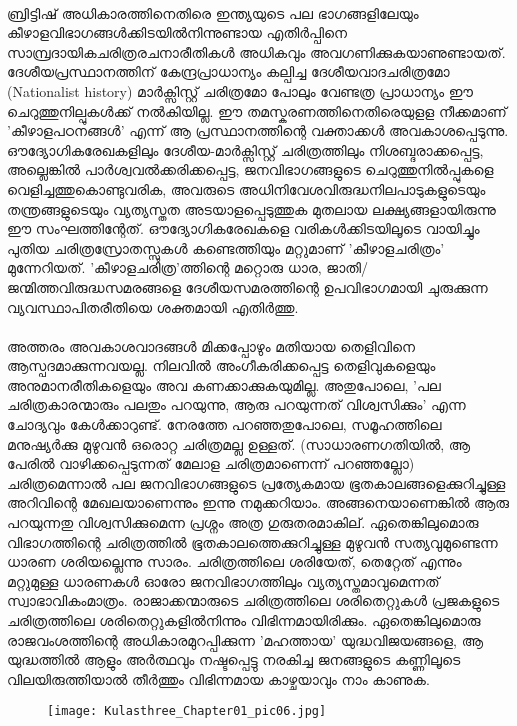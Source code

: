 \label{ch1box4} %
\begin{tcolorbox}[%
  breakable, %
  arc=0mm, 
  left=1pt, right = 1pt, 
  boxrule=0mm,
  colback = {blue!10}, %
] 
{\paragraph{}ബ്രിട്ടിഷ് അധികാരത്തിനെതിരെ ഇന്ത്യയുടെ പല ഭാഗങ്ങളിലേയും കീഴാളവിഭാഗങ്ങൾക്കിടയിൽനിന്നുണ്ടായ എതിർപ്പിനെ സാമ്പ്രദായികചരിത്രരചനാരീതികൾ അധികവും അവഗണിക്കുകയാണുണ്ടായത്. ദേശീയപ്രസ്ഥാനത്തിന് കേന്ദ്രപ്രാധാന്യം കല്പിച്ച ദേശീയവാദചരിത്രമോ (Nationalist history) മാർക്സിസ്റ്റ് ചരിത്രമോ പോലും വേണ്ടത്ര പ്രാധാന്യം ഈ ചെറുത്തുനില്പുകൾക്ക് നൽകിയില്ല. ഈ തമസ്കരണത്തിനെതിരെയുളള നീക്കമാണ് 'കീഴാളപഠനങ്ങൾ' എന്ന് ആ പ്രസ്ഥാനത്തിന്റെ വക്താക്കൾ അവകാശപ്പെടുന്നു. ഔദ്യോഗികരേഖകളിലും ദേശീയ-മാർക്സിസ്റ്റ് ചരിത്രത്തിലും നിശബ്ദരാക്കപ്പെട്ട, അല്ലെങ്കിൽ പാർശ്വവൽക്കരിക്കപ്പെട്ട, ജനവിഭാഗങ്ങളുടെ ചെറുത്തുനിൽപ്പുകളെ വെളിച്ചത്തുകൊണ്ടുവരിക, അവരുടെ അധിനിവേശവിരുദ്ധനിലപാടുകളുടെയും തന്ത്രങ്ങളുടെയും വ്യത്യസ്തത അടയാളപ്പെടുത്തുക മുതലായ ലക്ഷ്യങ്ങളായിരുന്നു ഈ സംഘത്തിന്റേത്. ഔദ്യോഗികരേഖകളെ വരികൾക്കിടയിലൂടെ വായിച്ചും പുതിയ ചരിത്രസ്രോതസ്സുകൾ കണ്ടെത്തിയും മറ്റുമാണ് 'കീഴാളചരിത്രം' മുന്നേറിയത്. 'കീഴാളചരിത്ര'ത്തിന്റെ മറ്റൊരു ധാര, ജാതി/ജന്മിത്തവിരുദ്ധസമരങ്ങളെ ദേശീയസമരത്തിന്റെ ഉപവിഭാഗമായി ചുരുക്കുന്ന വ്യവസ്ഥാപിതരീതിയെ ശക്തമായി എതിർത്തു.}
\end{tcolorbox}

\paragraph{}	അത്തരം അവകാശവാദങ്ങൾ മിക്കപ്പോഴും മതിയായ തെളിവിനെ ആസ്പദമാക്കുന്നവയല്ല. നിലവിൽ അംഗീകരിക്കപ്പെട്ട തെളിവുകളെയും അനുമാനരീതികളെയും അവ കണക്കാക്കുകയുമില്ല. അതുപോലെ, 'പല ചരിത്രകാരന്മാരും പലതും പറയുന്നു, ആരു പറയുന്നത് വിശ്വസിക്കും' എന്ന ചോദ്യവും കേൾക്കാറുണ്ട്. നേരത്തേ പറഞ്ഞതുപോലെ, സമൂഹത്തിലെ മനുഷ്യർക്കു മുഴുവൻ ഒരൊറ്റ ചരിത്രമല്ല ഉള്ളത്. (സാധാരണഗതിയിൽ, ആ പേരിൽ വാഴിക്കപ്പെടുന്നത് മേലാള ചരിത്രമാണെന്ന് പറഞ്ഞല്ലോ) ചരിത്രമെന്നാൽ പല ജനവിഭാഗങ്ങളുടെ പ്രത്യേകമായ ഭൂതകാലങ്ങളെക്കുറിച്ചുള്ള അറിവിന്റെ മേഖലയാണെന്നും ഇന്നു നമുക്കറിയാം. അങ്ങനെയാണെങ്കിൽ ആരു പറയുന്നതു വിശ്വസിക്കുമെന്ന പ്രശ്നം അത്ര ഗുരുതരമാകില്. ഏതെങ്കിലുമൊരു വിഭാഗത്തിന്റെ ചരിത്രത്തിൽ ഭൂതകാലത്തെക്കുറിച്ചുള്ള മുഴുവൻ സത്യവുമുണ്ടെന്ന ധാരണ ശരിയല്ലെന്നു സാരം. ചരിത്രത്തിലെ ശരിയേത്, തെറ്റേത് എന്നും മറ്റുമുള്ള ധാരണകൾ ഓരോ ജനവിഭാഗത്തിലും വ്യത്യസ്തമാവുമെന്നത് സ്വാഭാവികംമാത്രം. രാജാക്കന്മാരുടെ ചരിത്രത്തിലെ ശരിതെറ്റുകൾ പ്രജകളുടെ ചരിത്രത്തിലെ ശരിതെറ്റുകളിൽനിന്നും വിഭിന്നമായിരിക്കും. ഏതെങ്കിലുമൊരു രാജവംശത്തിന്റെ അധികാരമുറപ്പിക്കുന്ന 'മഹത്തായ' യുദ്ധവിജയങ്ങളെ, ആ യുദ്ധത്തിൽ ആളും അർത്ഥവും നഷ്ടപ്പെട്ടു നരകിച്ച ജനങ്ങളുടെ കണ്ണിലൂടെ വിലയിരുത്തിയാൽ തീർത്തും വിഭിന്നമായ കാഴ്ചയാവും നാം കാണുക.
\begin{figure}
\begin{center}
\texttt{[image: Kulasthree\_Chapter01\_pic06.jpg]}
\end{center}
\end{figure}

